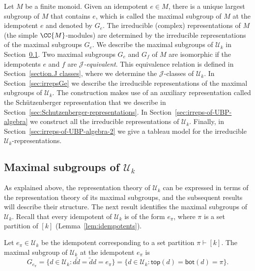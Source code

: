 Let $M$ be a finite monoid.
Given an idempotent $e \in M$, there is a unique largest subgroup of $M$ that
contains $e$, which is called the maximal subgroup of $M$ at the
idempotent $e$ and denoted by $G_e$.
The irreducible (complex) representations of $M$ (\ie the simple
$\CC{M}$-modules) are determined by the irreducible representations of the
maximal subgroups $G_e$. We describe the maximal subgroups of $\mathcal{U}_k$
in Section~\ref{sec:maximalsubgroups}.
Two maximal subgroups $G_e$ and $G_f$ of $M$ are isomorphic if the idempotents
$e$ and $f$ are \emph{$\mathscr{J}$-equivalent}.
This equivalence relation is defined in Section~\ref{section.J classes}, where
we determine the $\mathscr{J}$-classes of $\mathcal{U}_k$.
In Section~\ref{sec:irrepsGe} we describe the irreducible representations
of the maximal subgroups of $\mathcal{U}_k$.
The construction makes use of an auxiliary representation called the
Sch\"utzenberger representation that we describe in
Section~\ref{sec:Schutzenberger-representations}.
In Section~\ref{sec:irreps-of-UBP-algebra} we construct all the
irreducible representations of $\mathcal{U}_k$.
Finally, in Section~\ref{sec:irreps-of-UBP-algebra-2} we give a tableau model
for the irreducible $\mathcal{U}_k$-representations.

\subsection{Maximal subgroups of $\mathcal{U}_k$}
\label{sec:maximalsubgroups}

As explained above,
the representation theory of $\mathcal{U}_k$
can be expressed in terms of the representation theory of
its maximal subgroups, and the subsequent results will describe their structure.
The next result identifies the maximal subgroups of $\mathcal{U}_k$.
Recall that every idempotent of $\mathcal{U}_k$ is of the form
$e_\pi$, where $\pi$ is a set partition of $[k]$ (\cf Lemma~\ref{lem:idempotents}).

\begin{lemma}
    \label{lemma:maximal-subgroups}
    Let $e_\pi \in \mathcal{U}_k$ be the idempotent corresponding to a set partition
    $\pi \vdash [k]$.
    The maximal subgroup of $\mathcal{U}_k$ at the idempotent $e_\pi$ is
    \[
        G_{e_\pi} = \{d \in \mathcal{U}_k: d \widetilde{d} = \widetilde{d} d = e_\pi\}
                  = \{d \in \mathcal{U}_k: \mathsf{top}(d) =\mathsf{bot}(d) = \pi\}.
    \]
\end{lemma}

